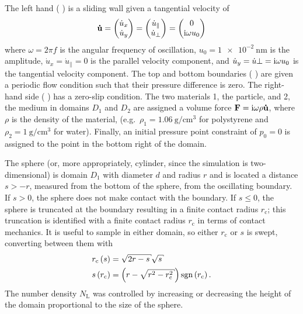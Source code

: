 The left hand (%
) %
is a sliding wall given a tangential velocity of
\begin{equation}
\mathbf{\dot{u}} =
\begin{pmatrix}
	\dot{u}_x\\
	\dot{u}_y
\end{pmatrix}
=
\begin{pmatrix}
	\dot{u}_\parallel\\
	\dot{u}_\perp
\end{pmatrix}
=
\begin{pmatrix}
	0\\
	{\mathrm{i}}\omega u_0
\end{pmatrix}
\end{equation}
where $\omega=2\pi f$ is the angular frequency of oscillation,
$u_0=\SI{1e-2}{\nano\meter}$ is the amplitude, $\dot{u}_x=\dot{u}_\parallel=0$
is the parallel velocity component, and
$\dot{u}_y=\dot{u}{\perp}={\mathrm{i}}\omega u_0$ is the tangential velocity
component.
The top and bottom
boundaries
(%
)%
are given a periodic flow condition such that their pressure difference
is zero.  The right-hand side (%
) %
has a zero-slip condition.  The two materials 1, the particle, and 2, the
medium in domains $D_1$ and $D_2$ are assigned a volume force $\mathbf{F}={\mathrm{i}} \omega \rho
\mathbf{\dot{u}}$,
where $\rho$ is the density of the material, (e.g.\ $\rho_1 =
\SI{1.06}{\gram\per\centi\meter\cubed}$ for polystyrene and $\rho_2 =
\SI{1}{\gram\per\centi\meter\cubed}$ for water).  Finally, an initial pressure point
constraint of $p_0=0$ is assigned to the point in the bottom right of the
domain.

The sphere (or, more appropriately, cylinder, since the simulation is two-dimensional) is domain $D_1$ with diameter $d$ and radius $r$ and is
located a distance $s>-r$, measured from the bottom of the sphere, from the
oscillating boundary.  If $s>0$, the sphere does not make contact with the
boundary.  If $s\leq0$, the sphere is truncated at the boundary resulting
in a finite contact radius $r_\mathrm{c}$; this truncation is identified with
a finite contact radius $r_\mathrm{c}$ in terms of contact mechanics.
It is useful to sample in either domain, so
either $r_\mathrm{c}$ or $s$ is swept, converting between them with
\begin{align}
 r_\mathrm{c}\left(s\right) &= \sqrt{2r-s}\sqrt{s}\\
 s\left(r_\mathrm{c}\right) &= \left(r-\sqrt{r^2-r_\mathrm{c}^2}\right)\sgn\left(r_\mathrm{c}\right).
\end{align}
The number density $N_\mathrm{L}$ was controlled by increasing or
decreasing the height of the domain proportional to the size of the sphere.

